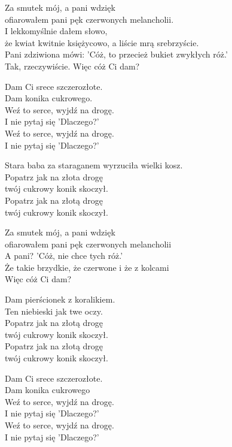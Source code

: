 \begin{text}
    Za smutek mój, a pani wdzięk\\
    ofiarowałem pani pęk czerwonych melancholii.\\
    I lekkomyślnie dałem słowo,\\
    że kwiat kwitnie księżycowo, a liście mrą srebrzyście.\\
    Pani zdziwiona mówi: 'Cóż, to przecież bukiet zwykłych róż.'\\
    Tak, rzeczywiście. Więc cóż Ci dam?

    Dam Ci srece szczerozłote.\\
    Dam konika cukrowego.\\
    Weź to serce, wyjdź na drogę.\\
    I nie pytaj się 'Dlaczego?'\\
    Weź to serce, wyjdź na drogę.\\
    I nie pytaj się 'Dlaczego?'

    Stara baba za staraganem wyrzuciła wielki kosz.\\
    Popatrz jak na złota drogę\\
    twój cukrowy konik skoczył.\\
    Popatrz jak na złotą drogę\\
    twój cukrowy konik skoczył.

    Za smutek mój, a pani wdzięk\\
    ofiarowałem pani pęk czerwonych melancholii\\
    A pani? 'Cóż, nie chce tych róż.'\\
    Że takie brzydkie, że czerwone i że z kolcami\\
    Więc cóż Ci dam?

    Dam pierścionek z koralikiem.\\
    Ten niebieski jak twe oczy.\\
    Popatrz jak na złotą drogę\\
    twój cukrowy konik skoczył.\\
    Popatrz jak na złotą drogę\\
    twój cukrowy konik skoczył.

    Dam Ci srece szczerozłote.\\
    Dam konika cukrowego\\
    Weź to serce, wyjdź na drogę.\\
    I nie pytaj się 'Dlaczego?'\\
    Weź to serce, wyjdź na drogę.\\
    I nie pytaj się 'Dlaczego?'
\end{text}
\begin{chord}

\end{chord}